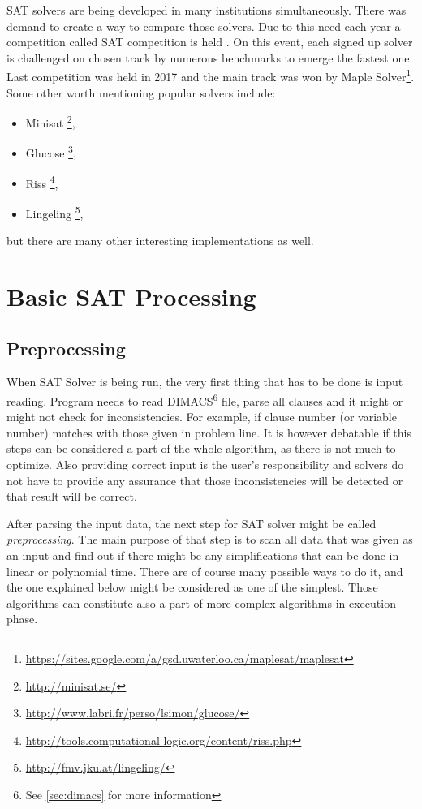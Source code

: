 \documentclass[12pt,english,pdflatex]{aghdpl}
\begin{document}
SAT solvers are being developed in many institutions simultaneously.
There was demand to create a way to compare those solvers. Due to
this need each year a competition  called SAT competition is held \cite{Satcomp}.
On this event, each signed up solver is challenged on chosen track
by numerous benchmarks to emerge the fastest one. Last competition
was held in 2017 and the main track was won by Maple Solver\footnote{\url{https://sites.google.com/a/gsd.uwaterloo.ca/maplesat/maplesat}}. Some other worth mentioning popular solvers include:
\begin{itemize}
\item Minisat \footnote{\url{http://minisat.se/}},
\item Glucose \footnote{\url{http://www.labri.fr/perso/lsimon/glucose/}},
\item Riss \footnote{\url{http://tools.computational-logic.org/content/riss.php}},
\item Lingeling \footnote{\url{http://fmv.jku.at/lingeling/}},
\end{itemize}
but there are many other interesting implementations as well.



\chapter{Basic SAT Processing}
\label{chap:Heuristics}

\section{Preprocessing}
\label{sec:Preprocessing}

When SAT Solver is being run, the very first thing that has to be
done is input reading. Program needs to read DIMACS\footnote{See \ref{sec:dimacs} for more information} file, parse all
clauses and it might or might not check for inconsistencies. For example,
if clause number (or variable number) matches with those given in
problem line. It is however debatable if this steps can be considered
a part of the whole algorithm, as there is not much to optimize. Also
providing correct input is the user's responsibility and solvers do not
have to provide any assurance that those inconsistencies will be detected
or that result will be correct. 

After parsing  the input data, the next step for SAT solver might be called
\textit{preprocessing}. The main  purpose of that step is to scan all data that
was given as an input and find out if there might be any simplifications
that can be done in linear or polynomial time. There are of course many possible ways to do it,
and the one explained below might be considered as one of the simplest.
Those algorithms can constitute  also a part of more complex algorithms in execution
phase.
\end{document}
